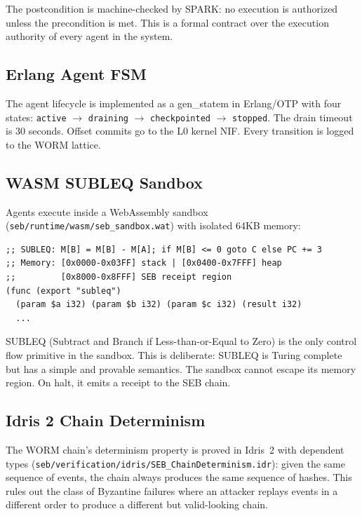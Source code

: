 \documentclass[11pt,a4paper]{article}
\begin{document}
The postcondition is machine-checked by SPARK: no execution is authorized
unless the precondition is met. This is a formal contract over the
execution authority of every agent in the system.

\subsection{Erlang Agent FSM}

The agent lifecycle is implemented as a gen\_statem in Erlang/OTP with
four states: \texttt{active} $\to$ \texttt{draining} $\to$
\texttt{checkpointed} $\to$ \texttt{stopped}. The drain timeout is
30 seconds. Offset commits go to the L0 kernel NIF. Every transition
is logged to the WORM lattice.

\subsection{WASM SUBLEQ Sandbox}

Agents execute inside a WebAssembly sandbox
(\texttt{seb/runtime/wasm/seb\_sandbox.wat}) with isolated 64KB memory:

\begin{lstlisting}[language={}]
;; SUBLEQ: M[B] = M[B] - M[A]; if M[B] <= 0 goto C else PC += 3
;; Memory: [0x0000-0x03FF] stack | [0x0400-0x7FFF] heap
;;         [0x8000-0x8FFF] SEB receipt region
(func (export "subleq")
  (param $a i32) (param $b i32) (param $c i32) (result i32)
  ...
\end{lstlisting}

SUBLEQ (Subtract and Branch if Less-than-or-Equal to Zero) is the only
control flow primitive in the sandbox. This is deliberate: SUBLEQ is
Turing complete~\cite{mazonka2011} but has a simple and provable
semantics. The sandbox cannot escape its memory region. On halt, it emits
a receipt to the SEB chain.

\subsection{Idris 2 Chain Determinism}

The WORM chain's determinism property is proved in Idris~2 with dependent
types (\texttt{seb/verification/idris/SEB\_ChainDeterminism.idr}): given
the same sequence of events, the chain always produces the same sequence
of hashes. This rules out the class of Byzantine failures where an
attacker replays events in a different order to produce a different but
valid-looking chain.
\end{document}
